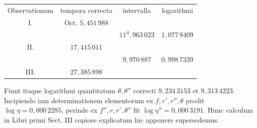 \begin{center}
\small\setlength{\tabcolsep}{8pt}\renewcommand{\arraystretch}{.85}
\begin{tabular}{@{}cccc@{}}
Observationum & tempora correcta & intervalla & logarithmi\\[.5em]
I. & Oct. $5{,}451\,988$ & & \\
 & & $11^{\mathrm{d}}{,}963\,023$ & $1{,}077\,8409$\\
II. & $17{,}415\,011$ & & \\
 & & $9{,}970\,887$ & $0{,}998\,7339$\\
III. & $27{,}385\,898$ & & \\
\end{tabular}
\end{center}
\noindent Fiunt itaque logarithmi quantitatum $\theta,\theta''$ correcti $9{,}234\,3153$ et $9{,}313\,4223$. Incipiendo iam determinationem elementorum ex $f,r',r'',\theta$ prodit $\log\eta=0{,}000\,2285$, perinde ex $f'',r,r',\theta''$ fit $\log\eta''=0{,}000\,3191$. Hunc calculum in Libri primi Sect. III copiose explicatum hic apponere supersedemus.

